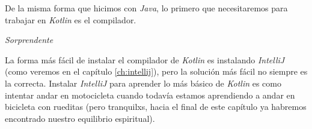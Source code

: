 De la misma forma que hicimos con \textit{Java}, lo primero que necesitaremos para trabajar en
\textit{Kotlin} es el compilador.
\begin{center}
  \textit{Sorprendente}
\end{center}

La forma más fácil de instalar el compilador de \textit{Kotlin} es instalando 
\textit{IntelliJ} (como veremos en el capítulo \ref{ch:intellij}), pero la 
solución más fácil no siempre es la correcta.
Instalar \textit{IntelliJ} para aprender lo más básico de \textit{Kotlin} es como intentar
andar en motocicleta cuando todavía estamos aprendiendo a andar en bicicleta con rueditas (pero 
tranquilxs, hacia el final de este capítulo ya habremos encontrado nuestro equilibrio espiritual).
